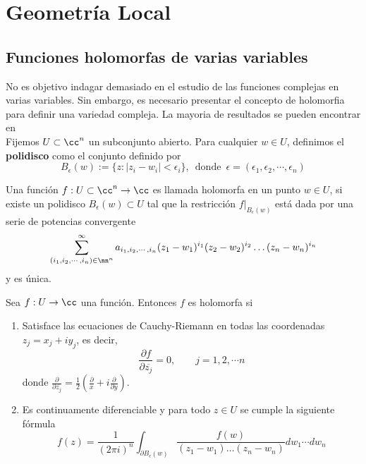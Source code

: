\section{Geometría Local}

\subsection{Funciones holomorfas de varias variables}

No es objetivo indagar demasiado en el estudio de las funciones complejas en varias variables. Sin embargo, es necesario presentar el concepto de holomorfia para definir una variedad compleja. La mayoria de resultados se pueden encontrar en \parencite[Cap 1, Sec 1.1]{huybrechts2005complex}\\
Fijemos $U\subset\cc^n$ un subconjunto abierto. Para cualquier $w\in U$, definimos el \textbf{polidisco} como el conjunto definido por
\begin{equation*}
	B_\epsilon(w):=\{z: |z_i-w_i|<\epsilon_i\},\enspace \text{donde}\enspace \epsilon=(\epsilon_1,\epsilon_2,\cdots,\epsilon_n)
\end{equation*}

\begin{definition}\label{taylor}
	Una función $f:U\subset \cc^n\to\cc$ es llamada holomorfa en un punto $w\in U$, si existe un polidisco $B_\epsilon(w)\subset U$ tal que la restricción $f\left.\right|_{B_\epsilon(w)}$ está dada por una serie de potencias convergente \begin{equation*}
		\sum_{(i_1,i_2,\cdots,i_n)\in\nn^n}^{\infty}a_{i_1,i_2,\cdots,i_n}(z_1-w_1)^{i_1}(z_2-w_2)^{i_2}\dots(z_n-w_n)^{i_n}
	\end{equation*}
	y es única.
\end{definition}

\begin{remark} Sea $f:U\to\cc$ una función. Entonces $f$ es holomorfa si 
	\begin{enumerate}
		\item Satisface las ecuaciones de Cauchy-Riemann en todas las coordenadas $z_j=x_j+iy_j$, es decir,
		\begin{equation*}
			\frac{\partial f}{\partial \overline{z_j}}=0,\qquad j=1,2,\cdots n
		\end{equation*}
		donde $\frac{\partial}{\partial \overline{z_j}}=\frac{1}{2}(\frac{\partial}{x}+i\frac{\partial }{\partial y})$.
		
		\item Es continuamente diferenciable y para todo $z\in U$ se cumple la siguiente fórmula
		\begin{equation*}
			f(z)=\frac{1}{(2\pi i)^n}\int_{\partial B_\epsilon(w)}\frac{f(w)}{(z_1-w_1)\dots(z_n-w_n)}dw_1\cdots dw_n
		\end{equation*}
	\end{enumerate}
	
\end{remark}

